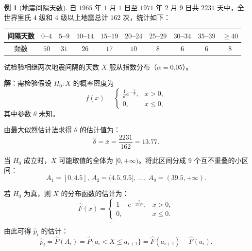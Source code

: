 \documentclass[11pt,a4paper]{report}
\theoremstyle{definition}
\newtheorem{example}{例}[chapter]
\begin{document}
\begin{example}[地震间隔天数]
自 $1965$ 年 $1$ 月 $1$ 日至 $1971$ 年 $2$ 月 $9$ 日共 $2231$ 天中，全世界里氏 $4$ 级和 $4$ 级以上地震总计 $162$ 次，统计如下：

\begin{table}[htbp]
\centering
\begin{tabular}{@{}cccccccccc@{}}
\toprule
间隔天数 & $0$--$4$ & $5$--$9$ & $10$--$14$ & $15$--$19$ & $20$--$24$ & $25$--$29$ & $30$--$34$ & $35$--$39$ & $\geq 40$ \\
\midrule
频数 & $50$ & $31$ & $26$ & $17$ & $10$ & $8$ & $6$ & $6$ & $8$ \\
\bottomrule
\end{tabular}
\end{table}

试检验相继两次地震间隔的天数 $X$ 服从指数分布（$\alpha=0.05$）。

\textbf{解}：需检验假设 $H_{0}\colon X$ 的概率密度为
\[
f(x)=\begin{cases}
\frac{1}{\theta}e^{-\frac{x}{\theta}}, & x>0,\\[0.3em]
0, & x\leq 0,
\end{cases}
\]
其中参数 $\theta$ 未知。

由最大似然估计法求得 $\theta$ 的估计值为：
\[
\widehat{\theta}=\bar{x}=\frac{2231}{162}=13.77.
\]

当 $H_{0}$ 成立时，$X$ 可能取值的全体为 $[0,+\infty)$。将此区间分成 $9$ 个互不重叠的小区间：
\[
A_{1}=[0,4.5],\ A_{2}=(4.5,9.5],\ \ldots,\ A_{9}=(39.5,+\infty).
\]

若 $H_{0}$ 为真，则 $X$ 的分布函数的估计为：
\[
\widehat{F}(x)=\begin{cases}
1-e^{-\frac{x}{13.77}}, & x>0,\\[0.3em]
0, & x\leq 0.
\end{cases}
\]

由此可得 $\widehat{p}_{i}$ 的估计：
\[
\widehat{p}_{i}=\widehat{P}(A_{i})=\widehat{P}\{a_{i}<X\leq a_{i+1}\}=\widehat{F}(a_{i+1})-\widehat{F}(a_{i}).
\]


\end{example}
\end{document}

